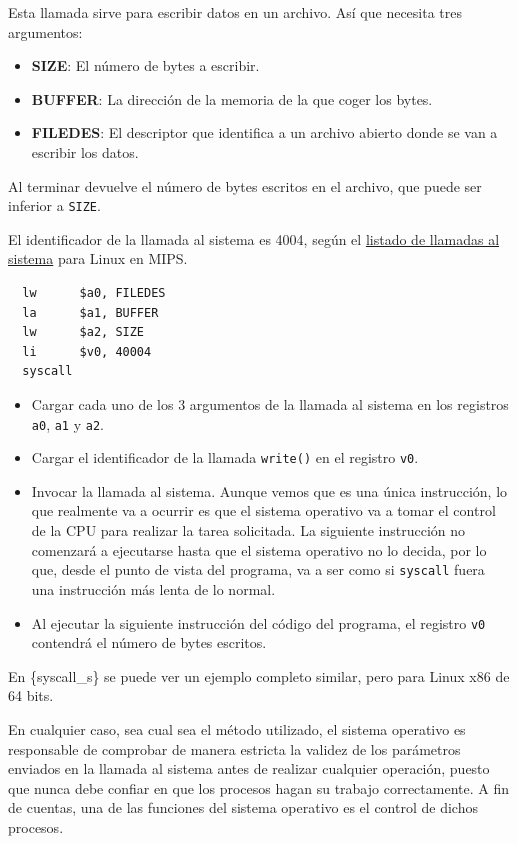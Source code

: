 Esta llamada sirve para escribir datos en un archivo. Así que necesita
tres argumentos:

\begin{itemize}
\item
  \textbf{SIZE}: El número de bytes a escribir.
\item
  \textbf{BUFFER}: La dirección de la memoria de la que coger los bytes.
\item
  \textbf{FILEDES}: El descriptor que identifica a un archivo abierto
  donde se van a escribir los datos.
\end{itemize}

Al terminar devuelve el número de bytes escritos en el archivo, que
puede ser inferior a \texttt{SIZE}.

El identificador de la llamada al sistema es 4004, según el
\href{https://github.com/torvalds/linux/blob/v4.20/arch/mips/include/uapi/asm/unistd.h}{listado
de llamadas al sistema} para Linux en MIPS.

\begin{verbatim}
  lw      $a0, FILEDES   
  la      $a1, BUFFER    
  lw      $a2, SIZE      
  li      $v0, 40004     
  syscall                
\end{verbatim}

\begin{itemize}
\item
  Cargar cada uno de los 3 argumentos de la llamada al sistema en los
  registros \texttt{a0}, \texttt{a1} y \texttt{a2}.
\item
  Cargar el identificador de la llamada \texttt{write()} en el registro
  \texttt{v0}.
\item
  Invocar la llamada al sistema. Aunque vemos que es una única
  instrucción, lo que realmente va a ocurrir es que el sistema operativo
  va a tomar el control de la CPU para realizar la tarea solicitada. La
  siguiente instrucción no comenzará a ejecutarse hasta que el sistema
  operativo no lo decida, por lo que, desde el punto de vista del
  programa, va a ser como si \texttt{syscall} fuera una instrucción más
  lenta de lo normal.
\item
  Al ejecutar la siguiente instrucción del código del programa, el
  registro \texttt{v0} contendrá el número de bytes escritos.
\end{itemize}

En \{syscall\_s\} se puede ver un ejemplo completo similar, pero para
Linux x86 de 64 bits.

En cualquier caso, sea cual sea el método utilizado, el sistema
operativo es responsable de comprobar de manera estricta la validez de
los parámetros enviados en la llamada al sistema antes de realizar
cualquier operación, puesto que nunca debe confiar en que los procesos
hagan su trabajo correctamente. A fin de cuentas, una de las funciones
del sistema operativo es el control de dichos procesos.

